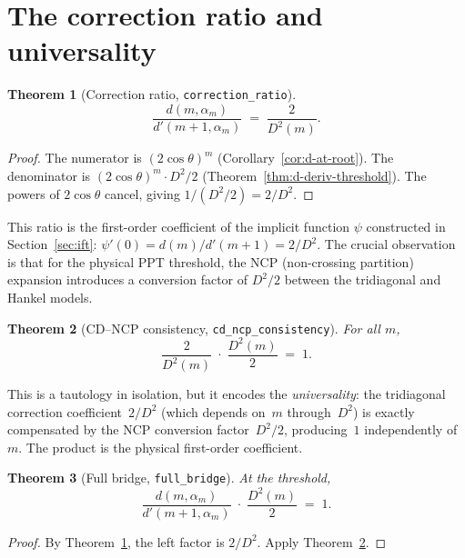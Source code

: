 \documentclass[11pt,a4paper]{article}
\theoremstyle{plain}
\newtheorem{theorem}{Theorem}[section]
\theoremstyle{definition}
\newcommand{\Dsq}{D^2}
\newcommand{\alpham}{\alpha_m}
\newcommand{\lean}[1]{\texttt{#1}}
\begin{document}
\section{The correction ratio and universality}
\label{sec:ratio}

\begin{theorem}[Correction ratio, \lean{correction\_ratio}]
\label{thm:correction-ratio}
\[
  \frac{d(m,\alpham)}{d'(m{+}1,\alpham)} \;=\; \frac{2}{\Dsq(m)}.
\]
\end{theorem}

\begin{proof}
The numerator is $(2\cos\theta)^m$ (Corollary~\ref{cor:d-at-root}).
The denominator is $(2\cos\theta)^m \cdot \Dsq/2$
(Theorem~\ref{thm:d-deriv-threshold}).
The powers of $2\cos\theta$ cancel, giving $1/(\Dsq/2) = 2/\Dsq$.
\end{proof}

This ratio is the first-order coefficient of the implicit function
$\psi$ constructed in Section~\ref{sec:ift}: $\psi'(0) = d(m)/d'(m{+}1) = 2/\Dsq$.
The crucial observation is that for the physical PPT threshold,
the NCP (non-crossing partition) expansion introduces a conversion
factor of $\Dsq/2$ between the tridiagonal and Hankel models.

\begin{theorem}[CD--NCP consistency, \lean{cd\_ncp\_consistency}]
\label{thm:cd-ncp}
For all $m$,
\[
  \frac{2}{\Dsq(m)} \;\cdot\; \frac{\Dsq(m)}{2} \;=\; 1.
\]
\end{theorem}

This is a tautology in isolation, but it encodes the \emph{universality}:
the tridiagonal correction coefficient~$2/\Dsq$ (which depends on~$m$
through~$\Dsq$) is exactly compensated by the NCP conversion
factor~$\Dsq/2$, producing~$1$ independently of~$m$.
The product is the physical first-order coefficient.

\begin{theorem}[Full bridge, \lean{full\_bridge}]
\label{thm:full-bridge}
At the threshold,
\[
  \frac{d(m,\alpham)}{d'(m{+}1,\alpham)} \;\cdot\; \frac{\Dsq(m)}{2} \;=\; 1.
\]
\end{theorem}

\begin{proof}
By Theorem~\ref{thm:correction-ratio}, the left factor is $2/\Dsq$.
Apply Theorem~\ref{thm:cd-ncp}.
\end{proof}

\end{document}
